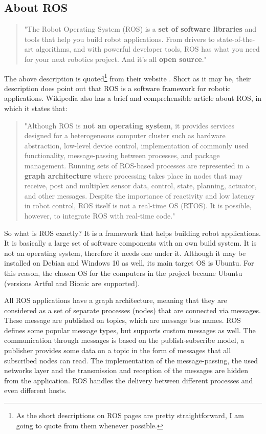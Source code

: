\subsection{About ROS}

\begin{quote}
"The Robot Operating System (ROS) is a \textbf{set of software libraries} and tools that help you build robot applications. From drivers to state-of-the-art algorithms, and with powerful developer tools, ROS has what you need for your next robotics project. And it's all \textbf{open source}."
\end{quote}

The above description is quoted\footnote{As the short descriptions on ROS pages are pretty straightforward, I am going to quote from them whenever possible.} from their website \cite{ros}. Short as it may be, their description does point out that ROS is a software framework for robotic applications. Wikipedia also has a brief and comprehensible article \cite{wiki_ros} about ROS, in which it states that:

\begin{quote}
"Although ROS is \textbf{not an operating system}, it provides services designed for a heterogeneous computer cluster such as hardware abstraction, low-level device control, implementation of commonly used functionality, message-passing between processes, and package management. Running sets of ROS-based processes are represented in a \textbf{graph architecture} where processing takes place in nodes that may receive, post and multiplex sensor data, control, state, planning, actuator, and other messages. Despite the importance of reactivity and low latency in robot control, ROS itself is not a real-time OS (RTOS). It is possible, however, to integrate ROS with real-time code."
\end{quote}

So what is ROS exactly? It is a framework that helps building robot applications. It is basically a large set of software components with an own build system. It is not an operating system, therefore it needs one under it. Although it may be installed on Debian and Windows 10 as well, its main target OS is Ubuntu. For this reason, the chosen OS for the computers in the project became Ubuntu (versions Artful and Bionic are supported).

All ROS applications have a graph architecture, meaning that they are considered as a set of separate processes (nodes) that are connected via messages. These message are published on topics, which are message bus names. ROS defines some popular message types, but supports custom messages as well. The communication through messages is based on the publish-subscribe model, a publisher provides some data on a topic in the form of messages that all subscribed nodes can read. The implementation of the message-passing, the used networks layer and the transmission and reception of the messages are hidden from the application. ROS handles the delivery between different processes and even different hosts.


